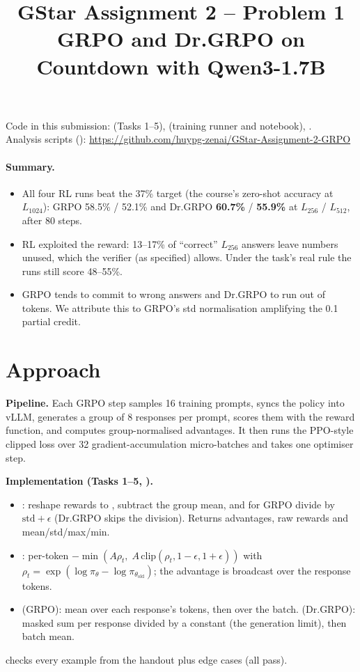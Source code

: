 \documentclass[10.5pt]{article}
\title{\textbf{GStar Assignment 2 -- Problem 1}\\[2pt]\large GRPO and Dr.GRPO on Countdown with Qwen3-1.7B}
\begin{document}
\maketitle
\vspace{-10pt}
\begin{center}\small
Code in this submission:  (Tasks 1--5),  (training runner and notebook), .\\
Analysis scripts (): \url{https://github.com/huypg-zenai/GStar-Assignment-2-GRPO}
\end{center}

\paragraph{Summary.}
\begin{itemize}
\item All four RL runs beat the 37\% target (the course's zero-shot accuracy at $L_{1024}$): GRPO 58.5\% / 52.1\% and
  Dr.GRPO \textbf{60.7\%} / \textbf{55.9\%} at $L_{256}$ / $L_{512}$, after 80 steps.
\item RL exploited the reward: 13--17\% of ``correct'' $L_{256}$ answers leave numbers unused, which the verifier (as
  specified) allows. Under the task's real rule the runs still score 48--55\%.
\item GRPO tends to commit to wrong answers and Dr.GRPO to run out of tokens. We attribute this to GRPO's std
  normalisation amplifying the 0.1 partial credit.
\end{itemize}

\section{Approach}
\textbf{Pipeline.} Each GRPO step samples 16 training prompts, syncs the policy into vLLM, generates a group of 8
responses per prompt, scores them with the reward function, and computes group-normalised advantages. It then runs the
PPO-style clipped loss over 32 gradient-accumulation micro-batches and takes one optimiser step.

\textbf{Implementation (Tasks 1--5, ).}
\begin{itemize}
\item {}: reshape rewards to \code{[prompts, G]}, subtract the group mean, and for
  GRPO divide by $\mathrm{std}+\epsilon$ (Dr.GRPO skips the division). Returns advantages, raw rewards and
  mean/std/max/min.
\item {}: per-token $-\min(A\rho_t,\;A\,\mathrm{clip}(\rho_t,1-\epsilon,1+\epsilon))$ with
  $\rho_t=\exp(\log\pi_\theta-\log\pi_{\theta_\text{old}})$; the advantage is broadcast over the response tokens.
\item {} (GRPO): mean over each response's tokens, then over the batch. 
  (Dr.GRPO): masked sum per response divided by a constant  (the generation limit), then batch mean.
\end{itemize}
 checks every example from the handout plus edge cases (all pass).
\end{document}
